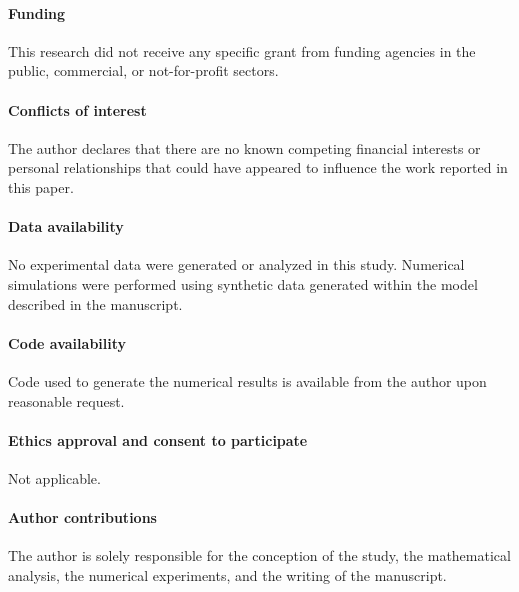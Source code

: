 \documentclass[12pt,a4paper]{article}
\theoremstyle{definition}
\theoremstyle{remark}
\begin{document}
\paragraph{Funding}
This research did not receive any specific grant from funding agencies in the public,
commercial, or not-for-profit sectors.

\paragraph{Conflicts of interest}
The author declares that there are no known competing financial interests or personal
relationships that could have appeared to influence the work reported in this paper.

\paragraph{Data availability}
No experimental data were generated or analyzed in this study. Numerical simulations
were performed using synthetic data generated within the model described in the
manuscript.

\paragraph{Code availability}
Code used to generate the numerical results is available from the author upon
reasonable request.

\paragraph{Ethics approval and consent to participate}
Not applicable.

\paragraph{Author contributions}
The author is solely responsible for the conception of the study, the mathematical
analysis, the numerical experiments, and the writing of the manuscript.



\pagebreak



	
	
	
	
\end{document}
